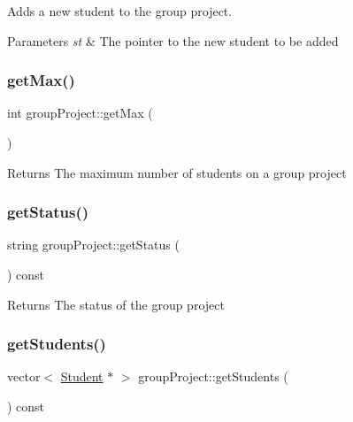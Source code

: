 Adds a new student to the group project. 


\begin{DoxyParams}{Parameters}
{\em st} & The pointer to the new student to be added \\
\hline
\end{DoxyParams}
\mbox{\label{classgroup_project_ae85c4f31c7a93c0758d75a74dfda0c4d}} 
\subsubsection{\texorpdfstring{get\+Max()}{getMax()}}
{\footnotesize\ttfamily int group\+Project\+::get\+Max (\begin{DoxyParamCaption}{ }\end{DoxyParamCaption})}

\begin{DoxyReturn}{Returns}
The maximum number of students on a group project 
\end{DoxyReturn}
\mbox{\label{classgroup_project_ae10d9246327845a2b1fc07dd1f01fdd7}} 
\subsubsection{\texorpdfstring{get\+Status()}{getStatus()}}
{\footnotesize\ttfamily string group\+Project\+::get\+Status (\begin{DoxyParamCaption}{ }\end{DoxyParamCaption}) const}

\begin{DoxyReturn}{Returns}
The status of the group project 
\end{DoxyReturn}
\mbox{\label{classgroup_project_a09aa7bbd96df1f27afe4f3543990e73c}} 
\subsubsection{\texorpdfstring{get\+Students()}{getStudents()}}
{\footnotesize\ttfamily vector$<$ \hyperlink{class_student}{Student} $\ast$ $>$ group\+Project\+::get\+Students (\begin{DoxyParamCaption}{ }\end{DoxyParamCaption}) const}

